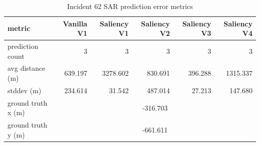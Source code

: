 \begin{table}[ht]
\centering
\caption{Incident 62 SAR prediction error metrics}
\label{tab:sar-incident-62}
\begin{tabular}{lrrrrr}
\hline
metric & Vanilla V1 & Saliency V1 & Saliency V2 & Saliency V3 & Saliency V4 \\
\hline
prediction count & 3 & 3 & 3 & 3 & 3 \\
avg distance (m) & 639.197 & 3278.602 & 830.691 & 396.288 & 1315.337 \\
stddev (m) & 234.614 & 31.542 & 487.014 & 27.213 & 147.680 \\
ground truth x (m) & \multicolumn{5}{c}{-316.703} \\
ground truth y (m) & \multicolumn{5}{c}{-661.611} \\
\hline
\end{tabular}
\end{table}
